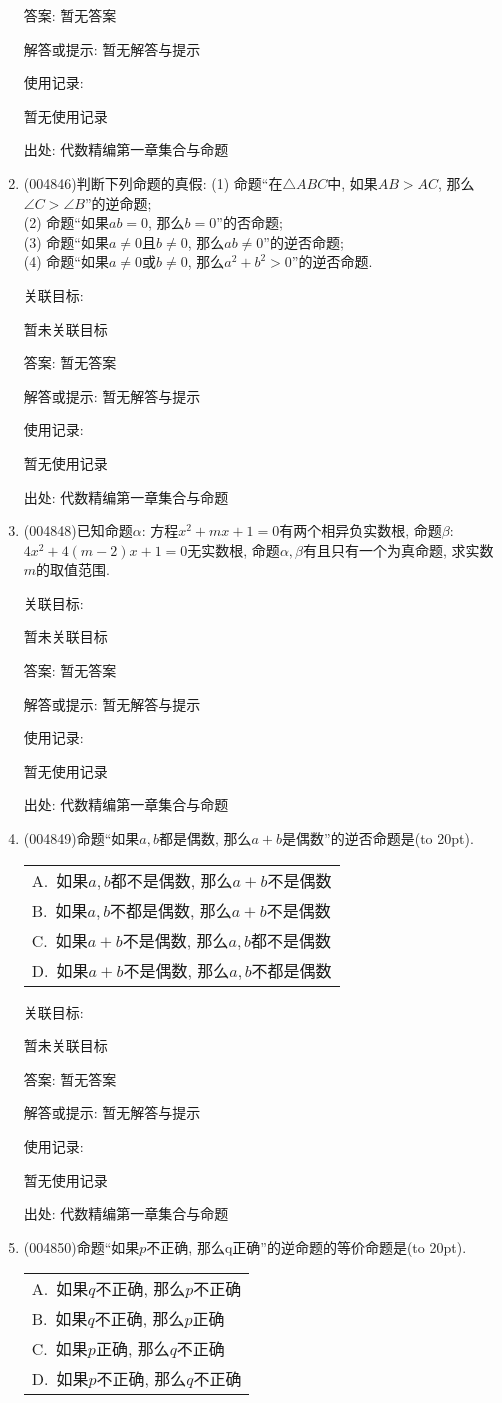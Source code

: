 \documentclass[10pt,a4paper]{article}
\newcommand{\bracket}[1]{(\hbox to #1pt{})}
\newcommand{\onech}[4]{\par\begin{tabular}{p{.9\textwidth}}
A.~#1\\
B.~#2\\
C.~#3\\
D.~#4
\end{tabular}}
\begin{document}
\begin{enumerate}[1.]
答案: 暂无答案

解答或提示: 暂无解答与提示

使用记录:

暂无使用记录


出处: 代数精编第一章集合与命题
\item { (004846)}判断下列命题的真假:
(1) 命题``在$\triangle ABC$中, 如果$AB>AC$, 那么$\angle C>\angle B$''的逆命题;\\
(2) 命题``如果$ab=0$, 那么$b=0$''的否命题;\\
(3) 命题``如果$a\ne 0$且$b\ne 0$, 那么$ab\ne 0$''的逆否命题;\\
(4) 命题``如果$a\ne 0$或$b\ne 0$, 那么$a^2+b^2>0$''的逆否命题.


关联目标:

暂未关联目标

答案: 暂无答案

解答或提示: 暂无解答与提示

使用记录:

暂无使用记录


出处: 代数精编第一章集合与命题
\item { (004848)}已知命题$\alpha$: 方程$x^2+mx+1=0$有两个相异负实数根, 命题$\beta$: $4x^2+4(m-2)x+1=0$无实数根, 命题$\alpha,\beta$有且只有一个为真命题, 求实数$m$的取值范围.


关联目标:

暂未关联目标

答案: 暂无答案

解答或提示: 暂无解答与提示

使用记录:

暂无使用记录


出处: 代数精编第一章集合与命题
\item { (004849)}命题``如果$a,b$都是偶数, 那么$a+b$是偶数''的逆否命题是\bracket{20}.
\onech{如果$a,b$都不是偶数, 那么$a+b$不是偶数}{如果$a,b$不都是偶数, 那么$a+b$不是偶数}{如果$a+b$不是偶数, 那么$a,b$都不是偶数}{如果$a+b$不是偶数, 那么$a,b$不都是偶数}


关联目标:

暂未关联目标

答案: 暂无答案

解答或提示: 暂无解答与提示

使用记录:

暂无使用记录


出处: 代数精编第一章集合与命题
\item { (004850)}命题``如果$p$不正确, 那么q正确''的逆命题的等价命题是\bracket{20}.
\onech{如果$q$不正确, 那么$p$不正确}{如果$q$不正确, 那么$p$正确}{如果$p$正确, 那么$q$不正确}{如果$p$不正确, 那么$q$不正确}



\end{enumerate}
\end{document}
